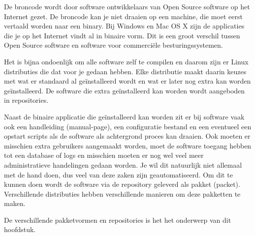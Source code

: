 De broncode wordt door software ontwikkelaars van Open Source software op het Internet gezet. De broncode kan je niet draaien op een machine, die moet eerst vertaald worden naar een binary. Bij Windows en Mac OS X zijn de applicaties die je op het Internet vindt al in binaire vorm. Dit is een groot verschil tussen Open Source software en software voor commerci\"ele besturingssystemen.

Het is bijna ondoenlijk om alle software zelf te compilen en daarom zijn er Linux distributies die dat voor je gedaan hebben. Elke distributie maakt daarin keuzes met wat er standaard al ge\"installeerd wordt en wat er later nog extra kan worden ge\"installeerd. De software die extra ge\"installeerd kan worden wordt aangeboden in repositories.

Naast de binaire applicatie die ge\"installeerd kan worden zit er bij software vaak ook een handleiding (manual-page), een configuratie bestand en een eventueel een opstart scripts als de software als achtergrond proces kan draaien. Ook moeten er misschien extra gebruikers aangemaakt worden, moet de software toegang hebben tot een database of logs en misschien moeten er nog wel veel meer administratieve handelingen gedaan worden. Je wil dit natuurlijk niet allemaal met de hand doen, dus veel van deze zaken zijn geautomatiseerd. Om dit te kunnen doen wordt de software via de repository geleverd als pakket (packet). Verschillende distributies hebben verschillende manieren om deze pakketten te maken.

De verschillende pakketvormen en repositories is het het onderwerp van dit hoofdstuk.

